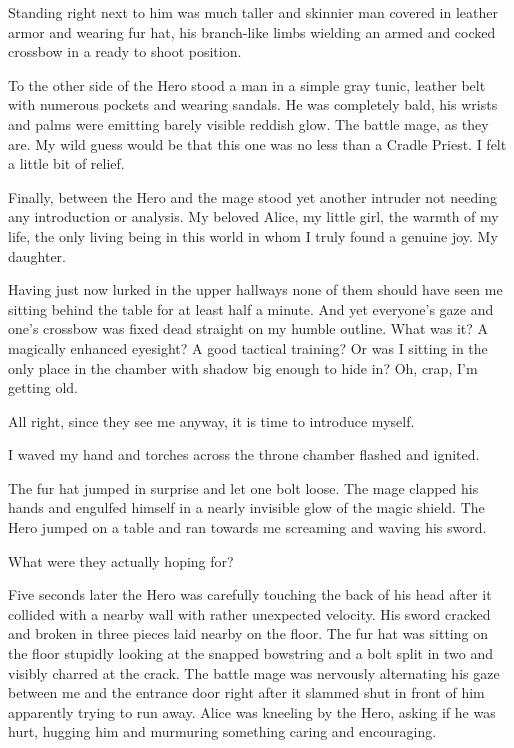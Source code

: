 Standing right next to him was much taller and skinnier man covered in leather armor and wearing fur hat, his branch-like limbs wielding an armed and cocked crossbow in a ready to shoot position.

To the other side of the Hero stood a man in a simple gray tunic, leather belt with numerous pockets and wearing sandals. He was completely bald, his wrists and palms were emitting barely visible reddish glow. The battle mage, as they are. My wild guess would be that this one was no less than a Cradle Priest. I felt a little bit of relief.

Finally, between the Hero and the mage stood yet another intruder not needing any introduction or analysis. My beloved Alice, my little girl, the warmth of my life, the only living being in this world in whom I truly found a genuine joy. My daughter.

Having just now lurked in the upper hallways none of them should have seen me sitting behind the table for at least half a minute. And yet everyone's gaze and one's crossbow was fixed dead straight on my humble outline. What was it? A magically enhanced eyesight? A good tactical training? Or was I sitting in the only place in the chamber with shadow big enough to hide in? Oh, crap, I'm getting old.

All right, since they see me anyway, it is time to introduce myself.

 I waved my hand and torches across the throne chamber flashed and ignited. 

The fur hat jumped in surprise and let one bolt loose. The mage clapped his hands and engulfed himself in a nearly invisible glow of the magic shield. The Hero jumped on a table and ran towards me screaming and waving his sword.

What were they actually hoping for?

Five seconds later the Hero was carefully touching the back of his head after it collided with a nearby wall with rather unexpected velocity. His sword cracked and broken in three pieces laid nearby on the floor. The fur hat was sitting on the floor stupidly looking at the snapped bowstring and a bolt split in two and visibly charred at the crack. The battle mage was nervously alternating his gaze between me and the entrance door right after it slammed shut in front of him apparently trying to run away. Alice was kneeling by the Hero, asking if he was hurt, hugging him and murmuring something caring and encouraging.

